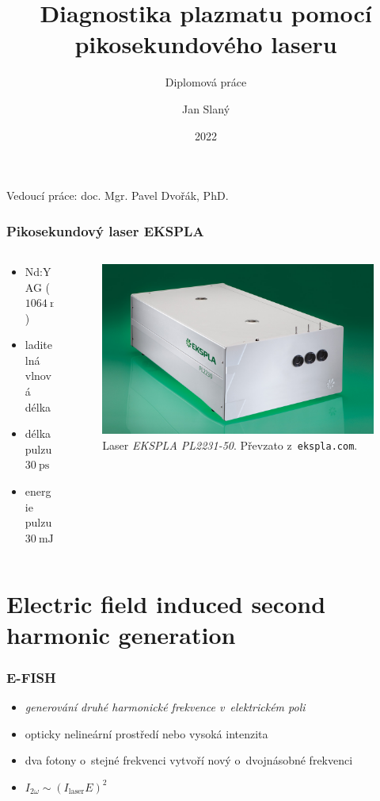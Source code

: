 \documentclass{beamer}
\title[Laserová diagnostika plazmatu]
{Diagnostika plazmatu pomocí pikosekundového laseru}
\subtitle{Diplomová práce}
\date{2022}
\author{Jan Slaný}
\institute[PřF MUNI]{Přírodovědecká fakulta Masarykovy univerzity\\
	Ústav fyzikální elektroniky}
\newcommand\elfield{E}
\newcommand\efish{I_{2\omega}}
\begin{document}
\begin{frame}[plain]
	\titlepage
	\footnotesize
	Vedoucí práce: \hfill doc. Mgr. Pavel Dvořák, PhD.
\end{frame}

\begin{frame}
	\frametitle{Pikosekundový laser EKSPLA}
	\begin{columns}
	\begin{column}{0.5\textwidth}
		\begin{itemize}
			\item Nd:YAG ($\SI{1064}{\nano\metre}$)
			\item laditelná vlnová délka
			\item délka pulzu $\SI{30}{\pico\second}$
			\item energie pulzu $\SI{30}{\milli\joule}$
		\end{itemize}
	\end{column}
	\begin{column}{0.5\textwidth}
		\begin{figure}
			\centering
			\includegraphics[width=\textwidth]{laser}
			\caption{Laser \emph{EKSPLA PL2231-50}.
				Převzato z~\texttt{ekspla.com}.}
		\end{figure}
	\end{column}
	\end{columns}
\end{frame}

\section[E-FISH]{Electric field induced second harmonic generation}

\begin{frame}
	\frametitle{E-FISH}
	\begin{itemize}
		\item \emph{generování druhé harmonické frekvence v~elektrickém poli}
		\item opticky nelineární prostředí nebo vysoká intenzita
		\item dva fotony o~stejné frekvenci vytvoří nový
			o~dvojnásobné frekvenci
		\item $\efish \sim (I_\mathrm{laser} \elfield)^2$
	\end{itemize}
\end{frame}
\end{document}
